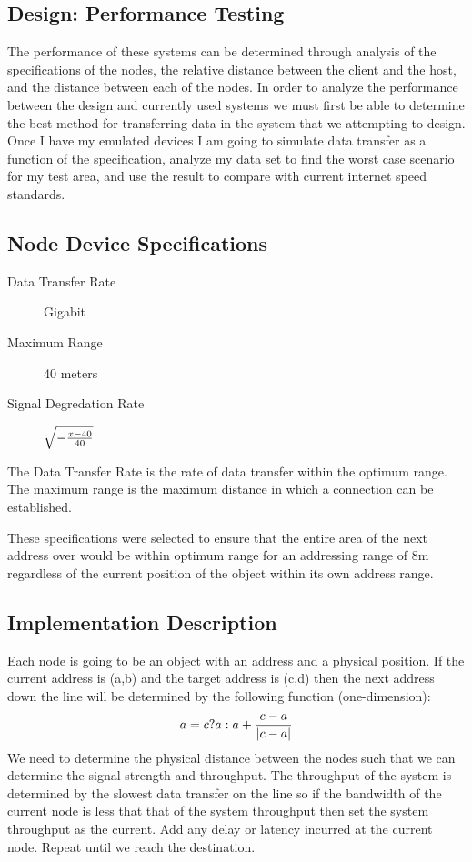 \documentclass{amsart}
\begin{document}
\subsection{Design: Performance Testing}
The performance of these systems can be determined through analysis of the specifications of the nodes, the relative distance between the client and the host, and the distance between each of the nodes. In order to analyze the performance between the design and currently used systems we must first be able to determine the best method for transferring data in the  system that we attempting to design. Once I have my emulated devices I am going to simulate data transfer as a function of the specification, analyze my data set to find the worst case scenario for my test area, and use the result to compare with current internet speed standards.
\subsection{Node Device Specifications}
\begin{description}
\item[Data Transfer Rate]Gigabit
\item[Maximum Range]40 meters
\item[Signal Degredation Rate]$\sqrt{-{{x-40}\over40}}$
\end{description}
The Data Transfer Rate is the rate of data transfer within the optimum range. The maximum range is the maximum distance in which a connection can be established.

These specifications were selected to ensure that the entire area of the next address over would be within optimum range for an addressing range of 8m regardless of the current position of the object within its own address range. 
\subsection{Implementation Description}
Each node is going to be an object with an address and a physical position. If the current address is (a,b) and the target address is (c,d) then the next address down the line will be determined by the following function (one-dimension):
\begin{equation}
a=c?a:a+{{c-a}\over{|c-a|}}
\end{equation}
We need to determine the physical distance between the nodes such that we can determine the signal strength and throughput. The throughput of the system is determined by the slowest data transfer on the line so if the bandwidth of the current node is less that that of the system throughput then set the system throughput as the current. Add any delay or latency incurred at the current node. Repeat until we reach the destination.
\end{document}
